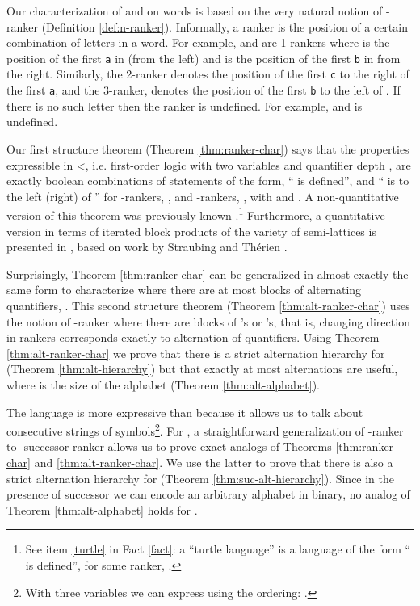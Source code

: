 \documentclass{LMCS}
\begin{document}
Our characterization of  and  on words is based
on the very natural notion of -ranker (Definition \ref{def:n-ranker}).
Informally, a ranker is the position of a certain combination of letters in
a word. For example,  and  are
1-rankers where  is the position of the first
\texttt{a} in  (from the left) and  is the position
of the first \texttt{b} in  from the right. Similarly, the 2-ranker  denotes the position of the first
\texttt{c} to the right of the first \texttt{a}, and the 3-ranker,  denotes the
position of the first \texttt{b} to the left of . If there is no such
letter then the ranker is undefined. For example,  and  is undefined.

Our first structure theorem (Theorem \ref{thm:ranker-char}) says that the
properties expressible in <, i.e. first-order logic with two
variables and quantifier depth , are exactly boolean combinations of
statements of the form, `` is defined'', and `` is to the left (right)
of '' for -rankers, , and -rankers, , with  and
. A non-quantitative version of this theorem was previously known
\cite{STV01}.\footnote{See item \ref{turtle} in Fact \ref{fact}: a ``turtle
  language'' is a language of the form `` is defined'', for some ranker,
  .} Furthermore, a quantitative version in terms of iterated block
products of the variety of semi-lattices is presented in \cite{TT07}, based
on work by Straubing and Th\'erien \cite{ST02}.

Surprisingly, Theorem \ref{thm:ranker-char} can be generalized in almost
exactly the same form to characterize  where there are at
most  blocks of alternating quantifiers, . This second structure
theorem (Theorem \ref{thm:alt-ranker-char}) uses the notion of
-ranker where there are  blocks of 's or 's, that
is, changing direction in rankers corresponds exactly to alternation of
quantifiers. Using Theorem \ref{thm:alt-ranker-char} we prove that there is
a strict alternation hierarchy for  (Theorem
\ref{thm:alt-hierarchy}) but that exactly at most 
alternations are useful, where  is the size of the alphabet
(Theorem \ref{thm:alt-alphabet}).

The language  is more expressive than  because
it allows us to talk about consecutive strings of symbols\footnote{With
  three variables we can express  using the ordering: .}. For , a
straightforward generalization of -ranker to -successor-ranker allows
us to prove exact analogs of Theorems \ref{thm:ranker-char} and
\ref{thm:alt-ranker-char}. We use the latter to prove that there is also a
strict alternation hierarchy for  (Theorem
\ref{thm:suc-alt-hierarchy}). Since in the presence of successor we can
encode an arbitrary alphabet in binary, no analog of Theorem
\ref{thm:alt-alphabet} holds for .
\end{document}

